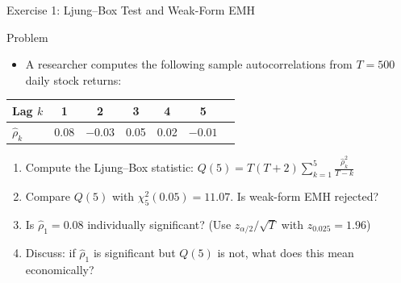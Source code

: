 \documentclass[9pt, aspectratio=169, t]{beamer}
\theoremstyle{definition}
\newenvironment{cminipage}[1]{%
    \par\noindent\hfill\begin{minipage}{#1}\ignorespaces
}{%
    \end{minipage}\hfill\null\par
}
\begin{document}
\begin{frame}{Exercise 1: Ljung--Box Test and Weak-Form EMH}
\begin{cminipage}{0.95\textwidth}
\begin{block}{Problem}
\begin{itemize}
\item A researcher computes the following sample autocorrelations from $T = 500$ daily stock returns:
\end{itemize}
\begin{center}
{\small
\renewcommand{\arraystretch}{1.2}
\begin{tabular}{lcccccc}
\toprule
Lag $k$ & 1 & 2 & 3 & 4 & 5 \\
\midrule
$\hat{\rho}_k$ & 0.08 & $-0.03$ & 0.05 & 0.02 & $-0.01$ \\
\bottomrule
\end{tabular}
}
\end{center}
\end{block}
\begin{enumerate}
    \item Compute the Ljung--Box statistic: $Q(5) = T(T+2)\sum_{k=1}^{5}\frac{\hat{\rho}_k^2}{T-k}$
    \item Compare $Q(5)$ with $\chi^2_5(0.05) = 11.07$. Is weak-form EMH rejected?
    \item Is $\hat{\rho}_1 = 0.08$ individually significant? (Use $z_{\alpha/2}/\sqrt{T}$ with $z_{0.025} = 1.96$)
    \item Discuss: if $\hat{\rho}_1$ is significant but $Q(5)$ is not, what does this mean economically?
\end{enumerate}
\end{cminipage}
\end{frame}
\end{document}
